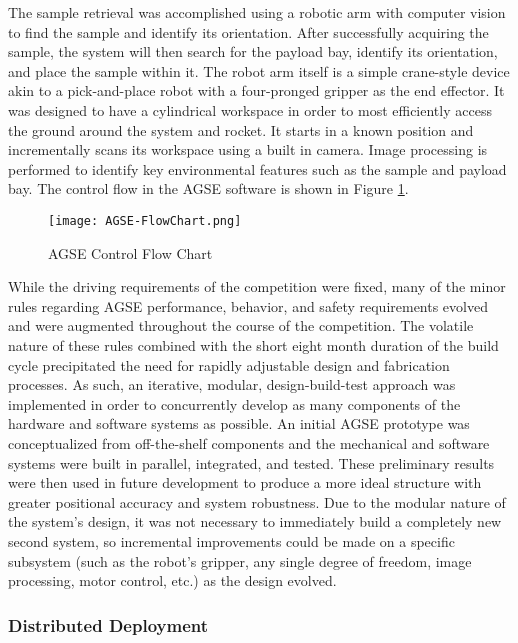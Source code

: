 The sample retrieval was accomplished using a robotic arm with
computer vision to find the sample and identify its orientation. After
successfully acquiring the sample, the system will then search for the
payload bay, identify its orientation, and place the sample within it.
The robot arm itself is a simple crane-style device akin to a
pick-and-place robot with a four-pronged gripper as the end effector.
It was designed to have a cylindrical workspace in order to most
efficiently access the ground around the system and rocket. It starts
in a known position and incrementally scans its workspace using a
built in camera. Image processing is performed to identify key
environmental features such as the sample and payload bay.  The
control flow in the AGSE software is shown in Figure
\ref{fig:AGSE-FlowChart}.

\begin{figure}[h]
	\centering
	\texttt{[image: AGSE-FlowChart.png]}
	\caption{AGSE Control Flow Chart}
	\label{fig:AGSE-FlowChart}
\end{figure}
\FloatBarrier

While the driving requirements of the competition were fixed, many of
the minor rules regarding AGSE performance, behavior, and safety
requirements evolved and were augmented throughout the course of the
competition. The volatile nature of these rules combined with the
short eight month duration of the build cycle precipitated the need
for rapidly adjustable design and fabrication processes. As such, an
iterative, modular, design-build-test approach was implemented in
order to concurrently develop as many components of the hardware and
software systems as possible. An initial AGSE prototype was
conceptualized from off-the-shelf components and the mechanical and
software systems were built in parallel, integrated, and tested. These
preliminary results were then used in future development to produce a
more ideal structure with greater positional accuracy and system
robustness.  Due to the modular nature of the system's design, it was
not necessary to immediately build a completely new second system, so
incremental improvements could be made on a specific subsystem (such
as the robot's gripper, any single degree of freedom, image
processing, motor control, etc.) as the design evolved.

\subsubsection{Distributed Deployment}

